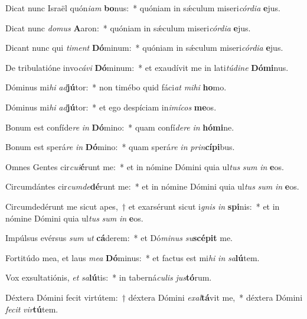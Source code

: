 \item Dicat nunc Israël quón\textit{i}\textit{am} \textbf{bo}nus:~* quóniam in sǽculum miseri\textit{cór}\textit{di}\textit{a} \textbf{e}jus.
\item Dicat nunc \textit{do}\textit{mus} \textbf{A}aron:~* quóniam in sǽculum miseri\textit{cór}\textit{di}\textit{a} \textbf{e}jus.
\item Dicant nunc qui \textit{ti}\textit{ment} \textbf{Dó}minum:~* quóniam in sǽculum miseri\textit{cór}\textit{di}\textit{a} \textbf{e}jus.
\item De tribulatióne invo\textit{cá}\textit{vi} \textbf{Dó}minum:~* et exaudívit me in lati\textit{tú}\textit{di}\textit{ne} \textbf{Dó}\textbf{mi}nus.
\item Dóminus mi\textit{hi} \textit{ad}\textbf{jú}tor:~* non timébo quid fáci\textit{at} \textit{mi}\textit{hi} \textbf{ho}mo.
\item Dóminus mi\textit{hi} \textit{ad}\textbf{jú}tor:~* et ego despíciam in\textit{i}\textit{mí}\textit{cos} \textbf{me}os.
\item Bonum est confíde\textit{re} \textit{in} \textbf{Dó}mino:~* quam confí\textit{de}\textit{re} \textit{in} \textbf{hó}\textbf{mi}ne.
\item Bonum est sperá\textit{re} \textit{in} \textbf{Dó}mino:~* quam sperá\textit{re} \textit{in} \textit{prin}\textbf{cí}\textbf{pi}bus.
\item Omnes Gentes cir\textit{cu}\textit{i}\textbf{é}runt me:~* et in nómine Dómini quia ul\textit{tus} \textit{sum} \textit{in} \textbf{e}os.
\item Circumdántes cir\textit{cum}\textit{de}\textbf{dé}runt me:~* et in nómine Dómini quia ul\textit{tus} \textit{sum} \textit{in} \textbf{e}os.
\item Circumdedérunt me sicut apes,~† et exarsérunt sicut i\textit{gnis} \textit{in} \textbf{spi}nis:~* et in nómine Dómini quia ul\textit{tus} \textit{sum} \textit{in} \textbf{e}os.
\item Impúlsus evérsus \textit{sum} \textit{ut} \textbf{cá}derem:~* et Dó\textit{mi}\textit{nus} \textit{su}\textbf{scé}\textbf{pit} me.
\item Fortitúdo mea, et laus \textit{me}\textit{a} \textbf{Dó}minus:~* et factus est mi\textit{hi} \textit{in} \textit{sa}\textbf{lú}tem.
\item Vox exsultatiónis, \textit{et} \textit{sa}\textbf{lú}tis:~* in taberná\textit{cu}\textit{lis} \textit{jus}\textbf{tó}rum.
\item Déxtera Dómini fecit virtútem:~† déxtera Dómini \textit{ex}\textit{al}\textbf{tá}vit me,~* déxtera Dómini \textit{fe}\textit{cit} \textit{vir}\textbf{tú}tem.
